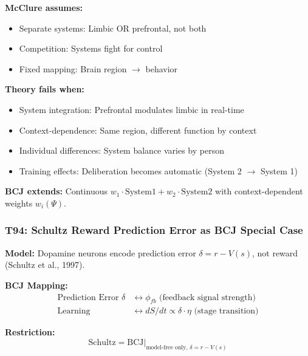 \begin{tcolorbox}[colback=red!5!white, colframe=red!75!black,
    title=Boundary Condition: Where McClure Fails]
\textbf{McClure assumes:}
\begin{itemize}[nosep]
\item Separate systems: Limbic OR prefrontal, not both
\item Competition: Systems fight for control
\item Fixed mapping: Brain region $\to$ behavior
\end{itemize}

\textbf{Theory fails when:}
\begin{itemize}[nosep]
\item System integration: Prefrontal modulates limbic in real-time
\item Context-dependence: Same region, different function by context
\item Individual differences: System balance varies by person
\item Training effects: Deliberation becomes automatic (System 2 $\to$ System 1)
\end{itemize}

\textbf{BCJ extends:} Continuous $w_1 \cdot \text{System1} + w_2 \cdot \text{System2}$ with context-dependent weights $w_i(\Psi)$.
\end{tcolorbox}

\subsubsection*{T94: Schultz Reward Prediction Error as BCJ Special Case}

\textbf{Model:} Dopamine neurons encode prediction error $\delta = r - V(s)$, not reward (Schultz et al., 1997).

\textbf{BCJ Mapping:}
\begin{align}
\text{Prediction Error } \delta &\leftrightarrow \phi_{fb} \text{ (feedback signal strength)} \\
\text{Learning} &\leftrightarrow dS/dt \propto \delta \cdot \eta \text{ (stage transition)}
\end{align}

\textbf{Restriction:}
\begin{equation}
\text{Schultz} = \text{BCJ} \big|_{\text{model-free only}, \, \delta = r - V(s)}
\end{equation}


